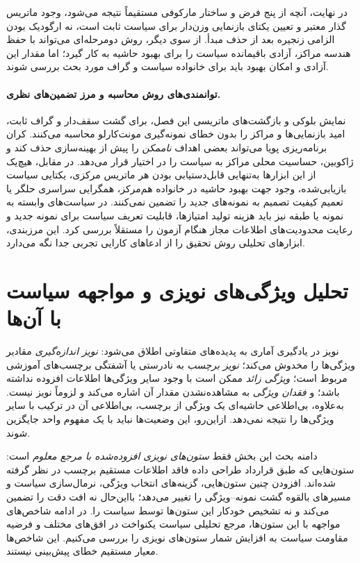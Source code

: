 در نهایت، آنچه از
پنج فرض و ساختار
مارکوفی مستقیماً
نتیجه می‌شود،
وجود ماتریس گذار
معتبر و تعیین
یکتای بازنمایی
وزن‌دار برای
سیاست ثابت است،
نه ارگودیک بودن
الزامی زنجیره
بعد از حذف مبدأ.
از سوی دیگر،
روش دومرحله‌ای
می‌تواند با حفظ
هندسه مراکز،
آزادی باقیمانده
سیاست را برای
بهبود حاشیه
به کار گیرد؛
اما مقدار این آزادی
و امکان بهبود
باید برای خانواده
سیاست و گراف
مورد بحث بررسی
شوند.

\paragraph{توانمندی‌های روش محاسبه و مرز تضمین‌های نظری.}
نمایش بلوکی و بازگشت‌های
ماتریسی این فصل،
برای گشت سقف‌دار و
گراف ثابت، امید
بازنمایی‌ها و مراکز را
بدون خطای نمونه‌گیری
مونت‌کارلو محاسبه می‌کنند.
کران برنامه‌ریزی پویا
می‌تواند بعضی اهداف
\emph{ناممکن} را پیش از
بهینه‌سازی حذف کند و
ژاکوبین، حساسیت محلی
مراکز به سیاست را
در اختیار قرار می‌دهد.
در مقابل، هیچ‌یک از
این ابزارها به‌تنهایی
قابل‌دستیابی بودن هر
ماتریس مرکزی، یکتایی
سیاست بازیابی‌شده،
وجود جهت بهبود حاشیه
در خانواده هم‌مرکز،
همگرایی سراسری حلگر
یا تعمیم کیفیت تصمیم
به نمونه‌های جدید را
تضمین نمی‌کنند.
در سیاست‌های وابسته
به نمونه یا طبقه نیز
باید هزینه تولید امتیازها،
قابلیت تعریف سیاست برای
نمونه جدید و رعایت
محدودیت‌های اطلاعات
مجاز هنگام آزمون را
مستقلاً بررسی کرد.
این مرزبندی، ابزارهای
تحلیلی روش تحقیق را
از ادعاهای کارایی تجربی
جدا نگه می‌دارد.


\section{تحلیل ویژگی‌های نویزی و مواجهه سیاست با آن‌ها}
\label{sec:ch3-noise-feature-analysis}
\label{sec:ch3-noise-and-outliers}%
نویز در یادگیری آماری به پدیده‌های متفاوتی
اطلاق می‌شود: \emph{نویز اندازه‌گیری}
مقادیر ویژگی‌ها را مخدوش می‌کند؛
\emph{نویز برچسب} به نادرستی یا آشفتگی
برچسب‌های آموزشی مربوط است؛
\emph{ویژگی زائد} ممکن است با وجود سایر
ویژگی‌ها اطلاعات افزوده نداشته باشد؛
و \emph{فقدان ویژگی} به مشاهده‌نشدن
مقدار آن اشاره می‌کند و لزوماً نویز نیست.
به‌علاوه، بی‌اطلاعی حاشیه‌ای یک ویژگی
از برچسب، بی‌اطلاعی آن در ترکیب
با سایر ویژگی‌ها را نتیجه نمی‌دهد.
ازاین‌رو، این وضعیت‌ها نباید
با یک مفهوم واحد جایگزین شوند.

دامنه بحث این بخش فقط
\emph{ستون‌های نویزی افزوده‌شده با مرجع معلوم}
است: ستون‌هایی که طبق قرارداد طراحی داده
فاقد اطلاعات مستقیم برچسب در نظر
گرفته شده‌اند. افزودن چنین ستون‌هایی،
گزینه‌های انتخاب ویژگی، نرمال‌سازی سیاست
و مسیرهای بالقوه گشت نمونه--ویژگی را
تغییر می‌دهد؛ بااین‌حال نه افت دقت
را تضمین می‌کند و نه تشخیص خودکار
این ستون‌ها توسط سیاست را.
در ادامه شاخص‌های مواجهه با این
ستون‌ها، مرجع تحلیلی سیاست یکنواخت
در افق‌های مختلف و فرضیه مقاومت سیاست
به افزایش شمار ستون‌های نویزی
را بررسی می‌کنیم. این شاخص‌ها
معیار مستقیم خطای پیش‌بینی نیستند.


